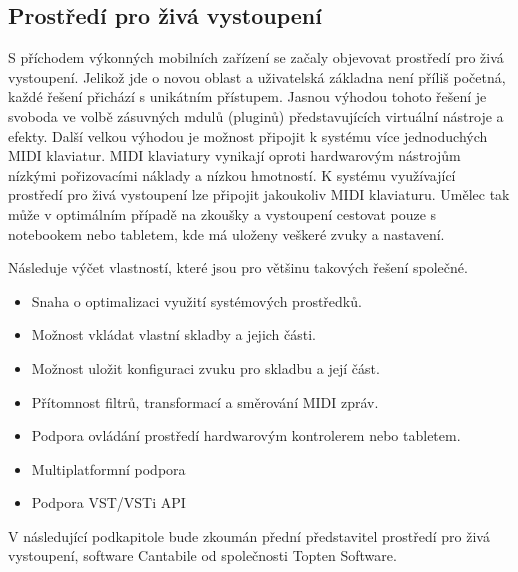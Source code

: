 \documentclass[thesis=M,czech]{FITthesis}[2019/03/06]
\begin{document}
		\subsection{Prostředí pro živá vystoupení}
			S příchodem výkonných mobilních zařízení se začaly objevovat prostředí pro živá vystoupení.
			Jelikož jde o novou oblast a uživatelská základna není příliš početná, každé řešení přichází s unikátním přístupem. 
			Jasnou výhodou tohoto řešení je svoboda ve volbě zásuvných mdulů (pluginů)
			představujících virtuální nástroje a efekty.
			Další velkou výhodou je možnost připojit
			k systému více jednoduchých MIDI klaviatur.
			MIDI klaviatury vynikají oproti hardwarovým nástrojům
			nízkými pořizovacími náklady a nízkou hmotností.
			K systému využívající prostředí pro živá vystoupení
			lze připojit jakoukoliv MIDI klaviaturu. Umělec
			tak může v optimálním případě na zkoušky a vystoupení cestovat pouze s notebookem nebo tabletem, kde má uloženy veškeré zvuky a nastavení.
			
			Následuje výčet vlastností, které jsou pro většinu takových řešení společné.
			
			\begin{itemize}
				\item Snaha o optimalizaci využití systémových prostředků.
				\item Možnost vkládat vlastní skladby a jejich části.
				\item Možnost uložit konfiguraci zvuku pro skladbu a její část.
				\item Přítomnost filtrů, transformací a směrování MIDI zpráv.
				\item Podpora ovládání prostředí hardwarovým kontrolerem nebo tabletem.
				\item Multiplatformní podpora
				\item Podpora VST/VSTi API
			\end{itemize}
		
			V následující podkapitole bude zkoumán přední představitel prostředí pro živá vystoupení,
			software Cantabile od společnosti Topten Software.
			
\end{document}
